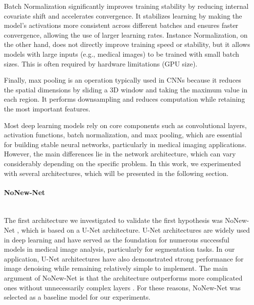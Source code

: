\documentclass[12pt]{article}
\begin{document}
Batch Normalization significantly improves training stability by reducing internal covariate shift and accelerates convergence.
It stabilizes learning by making the model's activations more consistent across different batches and ensures faster convergence, allowing the use of larger learning rates.
Instance Normalization, on the other hand, does not directly improve training speed or stability, but it allows models with large inputs (e.g., medical images) to be trained with small batch sizes.
This is often required by hardware limitations (GPU size).
\vspace{0.5cm}

Finally, max pooling is an operation typically used in CNNs because it reduces the spatial dimensions by sliding a 3D window and taking the maximum value in each region.
It performs downsampling and reduces computation while retaining the most important features.
\vspace{0.5cm}

Most deep learning models rely on core components such as convolutional layers, activation functions, batch normalization, and max pooling, which are essential for building stable neural networks, particularly in medical imaging applications.
However, the main differences lie in the network architecture, which can vary considerably depending on the specific problem.
In this work, we experimented with several architectures, which will be presented in the following section.


\paragraph{NoNew-Net}
\mbox{}\\

The first architecture we investigated to validate the first hypothesis was NoNew-Net \cite{NoNewNet}, which is based on a U-Net architecture.
U-Net architectures are widely used in deep learning and have served as the foundation for numerous successful models in medical image analysis, particularly for segmentation tasks.
In our application, U-Net architectures have also demonstrated strong performance for image denoising while remaining relatively simple to implement.
The main argument of NoNew-Net is that the architecture outperforms more complicated ones without unnecessarily complex layers \cite{NoNewNet}.
For these reasons, NoNew-Net was selected as a baseline model for our experiments.
\vspace{0.5cm}
\end{document}
